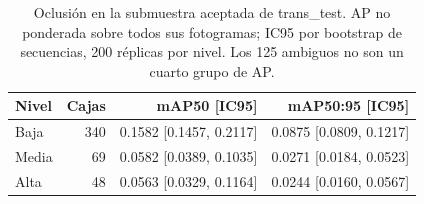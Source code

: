 \begin{table}[H]
\centering\small
\caption{Oclusión en la submuestra aceptada de trans\_test. AP no ponderada sobre todos sus fotogramas; IC95 por bootstrap de secuencias, 200 réplicas por nivel. Los 125 ambiguos no son un cuarto grupo de AP.}
\begin{tabular}{lrrr}
\toprule
Nivel & Cajas & mAP50 [IC95] & mAP50:95 [IC95] \\
\midrule
Baja & 340 & 0.1582 [0.1457, 0.2117] & 0.0875 [0.0809, 0.1217] \\
Media & 69 & 0.0582 [0.0389, 0.1035] & 0.0271 [0.0184, 0.0523] \\
Alta & 48 & 0.0563 [0.0329, 0.1164] & 0.0244 [0.0160, 0.0567] \\
\bottomrule
\end{tabular}
\end{table}
